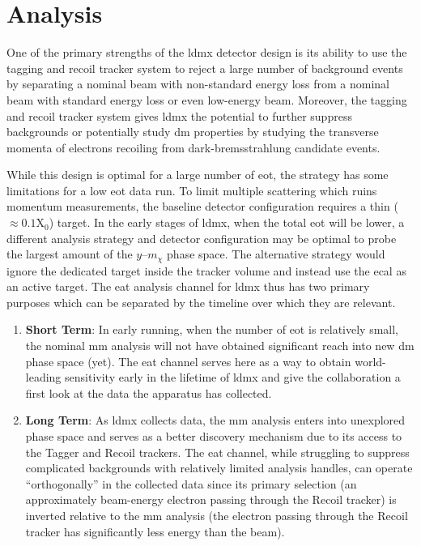 \chapter{Analysis}
\label{chapter:ldmx:analysis}

One of the primary strengths of the \ac{ldmx} detector design is its ability to use the tagging and
recoil tracker system to reject a large number of background events by separating a nominal beam
with non-standard energy loss from a nominal beam with standard energy loss or even low-energy
beam. Moreover, the tagging and recoil tracker system gives \ac{ldmx} the potential to further
suppress backgrounds or potentially study \ac{dm} properties by studying the transverse momenta of
electrons recoiling from dark-bremsstrahlung candidate events.

While this design is optimal for a large number of \ac{eot}, the strategy has some limitations for
a low \ac{eot} data run. To limit multiple scattering which ruins momentum measurements, the
baseline detector configuration requires a thin ($\approx 0.1\mathrm{X}_0$) target. In the early
stages of \ac{ldmx}, when the total \ac{eot} will be lower, a different analysis strategy and
detector configuration may be optimal to probe the largest amount of the $y$--$m_\chi$ phase
space. The alternative
strategy would ignore the dedicated target inside the tracker volume and instead use the \ac{ecal}
as an active target. The \ac{eat} analysis channel for \ac{ldmx} thus has two primary purposes
which can be separated by the timeline over which they are relevant.
\begin{enumerate}
  \item \textbf{Short Term}: In early running, when the number of \ac{eot} is
        relatively small, the nominal \ac{mm} analysis will not have obtained
        significant reach into new \ac{dm} phase space (yet). The \ac{eat} channel
        serves here as a way to obtain world-leading sensitivity early in the lifetime
        of \ac{ldmx} and give the collaboration a first look at the data the apparatus
        has collected.
  \item \textbf{Long Term}: As \ac{ldmx} collects data, the \ac{mm}
        analysis enters into unexplored phase space and serves as a better discovery
        mechanism due to its access to the Tagger and Recoil trackers. The \ac{eat}
        channel, while struggling to suppress complicated backgrounds with relatively
        limited analysis handles, can operate ``orthogonally'' in the collected data
        since its primary selection (an approximately beam-energy electron passing
        through the Recoil tracker) is inverted relative to the \ac{mm} analysis
        (the electron passing through the Recoil tracker has significantly less
        energy than the beam).
\end{enumerate}

